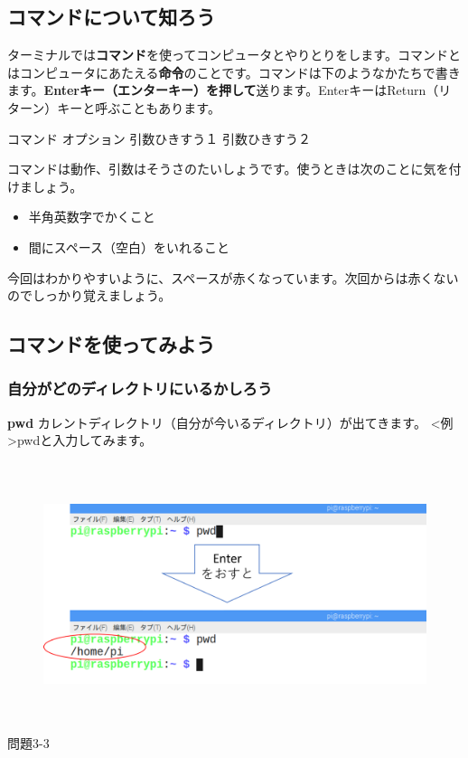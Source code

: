 \documentclass[a4paper,dvipdfmx]{jarticle}
\begin{document}
\subsection{コマンドについて知ろう}
ターミナルでは\textbf{コマンド}を使ってコンピュータとやりとりをします。コマンドとはコンピュータにあたえる\textbf{命令}のことです。コマンドは下のようなかたちで書きます。\textbf{Enterキー（エンターキー）を押して}送ります。EnterキーはReturn（リターン）キーと呼ぶこともあります。

コマンド\textcolor[rgb]{1.0,0.2,0.2}{
}オプション\textcolor[rgb]{1.0,0.2,0.2}{ }引数ひきすう１
引数ひきすう２

コマンドは動作、引数はそうさのたいしょうです。使うときは次のことに気を付けましょう。

\begin{itemize}
\item 半角英数字でかくこと
\item 間にスペース（空白）をいれること
\end{itemize}

\bigskip

今回はわかりやすいように、スペースが赤くなっています。次回からは赤くないのでしっかり覚えましょう。

\subsection{}
\clearpage\subsection{コマンドを使ってみよう}
\subsubsection{自分がどのディレクトリにいるかしろう}
\textbf{pwd}\newline
カレントディレクトリ（自分が今いるディレクトリ）が出てきます。\newline
{\textless}例{\textgreater}pwdと入力してみます。

\subsubsection*{}
\begin{figure}
\centering
\includegraphics[width=15.42cm,height=7.239cm]{text03-img/text03-img007.png}
\end{figure}
{\ttfamily
問題3-3}
\end{document}
